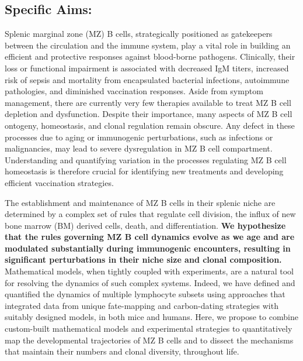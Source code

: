 \documentclass[11pt]{article}
\begin{document}
\pagestyle{empty}
\subsection*{Specific Aims:}
\vspace{-2mm}
Splenic marginal zone (MZ) B cells, strategically positioned as gatekeepers between the circulation and the immune system, play a vital role in building an efficient and protective responses against blood-borne pathogens. 
Clinically, their loss or functional impairment is associated with decreased IgM titers, increased risk of sepsis and mortality from encapsulated bacterial infections, autoimmune pathologies, and diminished vaccination responses.
Aside from symptom management, there are currently very few therapies available to treat MZ B cell depletion and dysfunction.
Despite their importance, many aspects of MZ B cell ontogeny, homeostasis, and clonal regulation remain obscure.
Any defect in these processes due to aging or immunogenic perturbations, such as infections or malignancies, may lead to severe dysregulation in MZ B cell compartment.
Understanding and quantifying variation in the processes regulating MZ B cell homeostasis is therefore crucial for identifying new treatments and developing efficient vaccination strategies.

The establishment and maintenance of MZ B cells in their splenic niche are determined by a complex set of rules that regulate cell division, the influx of new bone marrow (BM) derived cells, death, and differentiation. 
\textbf{We hypothesize that the rules governing MZ B cell dynamics evolve as we age and are modulated substantially during immunogenic encounters, resulting in significant perturbations in their niche size and clonal composition.}
Mathematical models, when tightly coupled with experiments, are a natural tool for resolving the dynamics of such complex systems.
Indeed, we have defined and quantified the dynamics of multiple lymphocyte subsets using approaches that integrated data from unique fate-mapping and carbon-dating strategies with suitably designed models, in both mice and humans.
Here, we propose to combine custom-built mathematical models and experimental strategies to quantitatively map the developmental trajectories of MZ B cells and to dissect the mechanisms that maintain their numbers and clonal diversity, throughout life.
\end{document}
